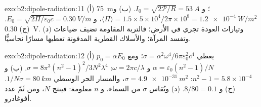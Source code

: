 \begin{solution}{exo:b2:dipole-radiation:11}
(أ) \qty{75}{m}؛ و $I_0 = \sqrt{2\mathcal P/R} = \qty{53}{A}$. (ب) و $\langle\Pi\rangle = 1.5 \times
5 \times 10^4/2\pi \times 10^8 = \qty{1.2e-4}{W/m^2}$، و $E_0 = \sqrt{2\Pi/\varepsilon_0c} = \qty{0.30}{V/m}$.
(ج) \qty{0.30}{V}. (د) وتيارات العودة تجري في الأرض؛ فالتربة المقاومة
تضيف ضياعات وتفسد المرآة؛ والأسلاك القطرية المدفونة تعطيها
مسارًا نحاسيًّا.
\end{solution}

\begin{solution}{exo:b2:dipole-radiation:12}
(أ) $p_0 = \alpha E_0$ يعطي $\sigma = \alpha^2\omega^4/6\pi\varepsilon_0^2c^4$؛ ومع $\alpha = \varepsilon_0(n^2
- 1)/N$ و $\omega = 2\pi c/\lambda$: $\sigma = 8\pi^3(n^2 - 1)^2/3N^2\lambda^4$. (ب) و $n^2 - 1 =
5.8 \times 10^{-4}$: $\sigma = \qty{4.9e-31}{m^2}$، والمسار الحر الوسطي $1/N\sigma = \qty{80}{km}$. (ج)
و $8/80 = 0.1$. (د) ويُقاس $\sigma$ من  السماء، و $n$
معلومة: فينتج $N$، ومن ثَمّ عدد أفوغادرو.
\end{solution}

